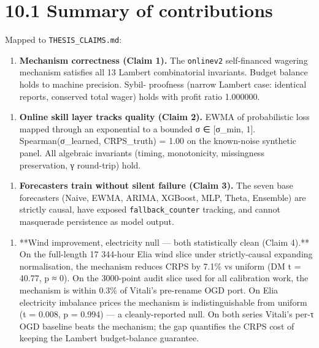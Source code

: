 \documentclass[11pt,a4paper,openany]{report}
\begin{document}
\section{10.1 Summary of contributions}

Mapped to \texttt{THESIS\_CLAIMS.md}:

\begin{enumerate}
  \item \textbf{Mechanism correctness (Claim 1).} The \texttt{onlinev2} self-financed
    wagering mechanism satisfies all 13 Lambert combinatorial
    invariants. Budget balance holds to machine precision. Sybil-
    proofness (narrow Lambert case: identical reports, conserved total
    wager) holds with profit ratio 1.000000.
\end{enumerate}

\begin{enumerate}
  \item \textbf{Online skill layer tracks quality (Claim 2).} EWMA of
    probabilistic loss mapped through an exponential to a bounded
    σ ∈ [σ\_min, 1]. Spearman(σ\_learned, CRPS\_truth) = 1.00 on the
    known-noise synthetic panel. All algebraic invariants (timing,
    monotonicity, missingness preservation, γ round-trip) hold.
\end{enumerate}

\begin{enumerate}
  \item \textbf{Forecasters train without silent failure (Claim 3).} The seven
    base forecasters (Naive, EWMA, ARIMA, XGBoost, MLP, Theta,
    Ensemble) are strictly causal, have exposed \texttt{fallback\_counter}
    tracking, and cannot masquerade persistence as model output.
\end{enumerate}

\begin{enumerate}
  \item **Wind improvement, electricity null — both statistically clean
    (Claim 4).** On the full-length 17 344-hour Elia wind slice under
    strictly-causal expanding normalisation, the mechanism reduces CRPS
    by 7.1\% vs uniform (DM t = 40.77, p ≈ 0). On the 3000-point audit
    slice used for all calibration work, the mechanism is within 0.3\%
    of Vitali's pre-rename OGD port. On Elia electricity imbalance
    prices the mechanism is indistinguishable from uniform
    (t = 0.008, p = 0.994) — a cleanly-reported null. On both series
    Vitali's per-τ OGD baseline beats the mechanism; the gap
    quantifies the CRPS cost of keeping the Lambert budget-balance
    guarantee.
\end{enumerate}
\end{document}
